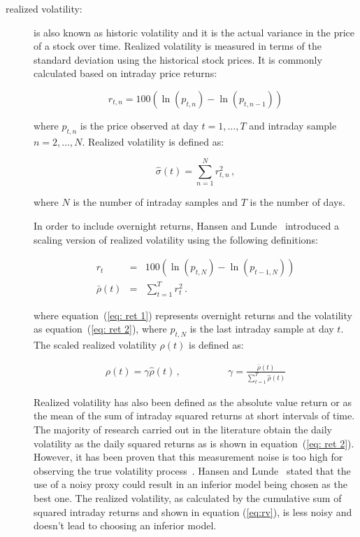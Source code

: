 \begin{description}%
\item[realized volatility:] is also known as historic volatility and
it is the actual variance in the price of a stock over time.
Realized volatility is measured in terms of the standard deviation
using the historical stock prices. It is commonly calculated based on
intraday price returns:

\begin{equation}
\label{eq:retintra}
r_{t,n}=100(\ln(p_{t,n}) - \ln(p_{t,n-1}))
\end{equation}

\noindent where $p_{t,n}$ is the price observed at day $t=1,\dots,T$ and
intraday sample $n=2,\dots,N$. Realized volatility is defined as:

\begin{equation}
\label{eq:rv}
    \hat{\sigma}(t) = \sum_{n=1}^N r_{t,n}^2 \, , 
\end{equation}

\noindent where $N$ is the number of intraday samples and $T$ is the
number of days. 

In order to include overnight returns, Hansen and
Lunde~\cite{hansen+lunde2005} introduced a scaling version of
realized volatility using the following definitions:

\begin{eqnarray}
r_{t}&=&100(\ln(p_{t,N}) - \ln(p_{t-1,N})) \label{eq: ret 1} \\
\bar{\rho}(t) &=& \sum_{t=1}^T r_{t}^2  \label{eq: ret 2} \, .
\end{eqnarray}

\noindent where equation~(\ref{eq: ret 1}) represents overnight 
returns and the volatility as 
equation~(\ref{eq: ret 2}), where $p_{t,N}$ is the last intraday 
sample at day $t$. The scaled realized volatility $\rho(t)$ is 
defined as:

\begin{eqnarray}
\label{eq:srv}
\rho(t) = \gamma \hat{\rho}(t) \, , \qquad & \qquad \gamma = \displaystyle \frac{\bar{\rho}(t)}{\displaystyle\sum_{t=1}^T \hat{\rho}(t)}
\end{eqnarray}


Realized volatility has also been defined as the absolute value return or as the mean of the sum of intraday squared returns at short intervals of time. The majority of research carried out in the literature obtain the daily volatility as the daily squared returns as is shown in equation~(\ref{eq: ret 2}).  However, it has been proven that this measurement noise is too high for observing the true volatility process~\cite{andersen+bollerslev1998}. Hansen and Lunde~\cite{hansen+lunde2006} stated that the use of a noisy proxy could result in an inferior model being chosen as the best one. The realized volatility, as calculated by the cumulative sum of squared intraday returns and shown in equation (\ref{eq:rv}), is less noisy and doesn't lead to choosing an inferior model.   



\end{description}
